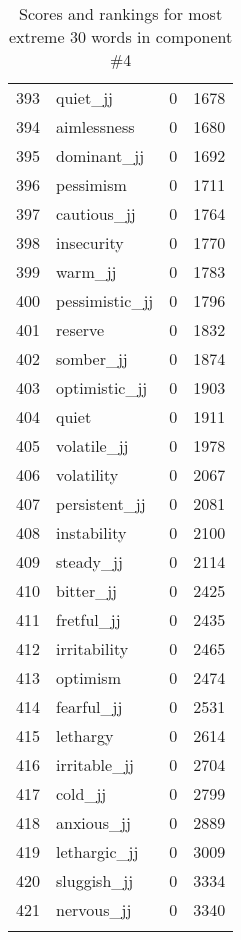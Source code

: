 \begin{longtable}[!htbp]{| rlr@{.}l |}
    393 & quiet\_jj & 0 & 1678 \\
    394 & aimlessness & 0 & 1680 \\
    395 & dominant\_jj & 0 & 1692 \\
    396 & pessimism & 0 & 1711 \\
    397 & cautious\_jj & 0 & 1764 \\
    398 & insecurity & 0 & 1770 \\
    399 & warm\_jj & 0 & 1783 \\
    400 & pessimistic\_jj & 0 & 1796 \\
    401 & reserve & 0 & 1832 \\
    402 & somber\_jj & 0 & 1874 \\
    403 & optimistic\_jj & 0 & 1903 \\
    404 & quiet & 0 & 1911 \\
    405 & volatile\_jj & 0 & 1978 \\
    406 & volatility & 0 & 2067 \\
    407 & persistent\_jj & 0 & 2081 \\
    408 & instability & 0 & 2100 \\
    409 & steady\_jj & 0 & 2114 \\
    410 & bitter\_jj & 0 & 2425 \\
    411 & fretful\_jj & 0 & 2435 \\
    412 & irritability & 0 & 2465 \\
    413 & optimism & 0 & 2474 \\
    414 & fearful\_jj & 0 & 2531 \\
    415 & lethargy & 0 & 2614 \\
    416 & irritable\_jj & 0 & 2704 \\
    417 & cold\_jj & 0 & 2799 \\
    418 & anxious\_jj & 0 & 2889 \\
    419 & lethargic\_jj & 0 & 3009 \\
    420 & sluggish\_jj & 0 & 3334 \\
    421 & nervous\_jj & 0 & 3340 \\
    \hline
    \caption{Scores and rankings for most extreme 30 words in component \#4} \\
\end{longtable}

